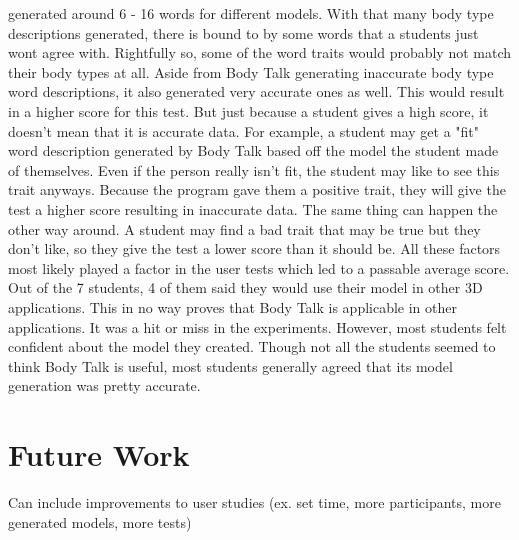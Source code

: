 \documentclass[journal]{vgtc}                %
\begin{document}
generated around 6 - 16 words for different models. With that many body type descriptions generated, there is bound to by some words that a students just 
wont agree with. Rightfully so, some of the word traits would probably not match their body types at all. Aside from Body Talk generating inaccurate body 
type word descriptions, it also generated very accurate ones as well. This would result in a higher score for this test. But just because a student gives 
a high score, it doesn't mean that it is accurate data. For example, a student may get a "fit" word description generated by Body Talk based off the 
model the student made of themselves. Even if the person really isn't fit, the student may like to see this trait anyways. Because the program gave them 
a positive trait, they will give the test a higher score resulting in inaccurate data. The same thing can happen the other way around. A student may find 
a bad trait that may be true but they don't like, so they give the test a lower score than it should be. All these factors most likely played a factor in 
the user tests which led to a passable average score. Out of the 7 students, 4 of them said they would use their model in other 3D applications. This in no way proves that Body Talk is applicable in other applications. It was a hit or miss in the experiments. However, most students felt confident about the model they created. Though not all the students seemed to think Body Talk is useful, most students generally agreed that its model generation was pretty accurate. \newline

\noindent       

\section{Future Work}

Can include improvements to user studies (ex. set time, more participants, more generated models, more tests) 
\end{document}
